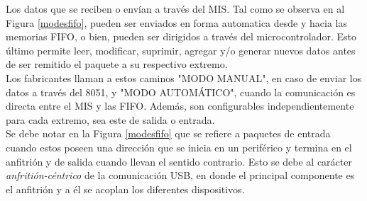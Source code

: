 		Los datos que se reciben o envían a través del MIS. Tal como se observa en al Figura \ref{modesfifo}, pueden ser enviados en forma automatica desde y hacia las memorias FIFO, o bien, pueden ser dirigidos a través del microcontrolador. Esto último permite leer, modificar, suprimir, agregar y/o generar nuevos datos antes de ser remitido el paquete a su respectivo extremo.\\
	
		Los fabricantes llaman a estos caminos "MODO MANUAL", en caso de enviar los datos a través del 8051, y "MODO AUTOMÁTICO", cuando la comunicación es directa entre el MIS y las FIFO. Además, son configurables independientemente para cada extremo, sea este de salida o entrada.\\
	
		Se debe notar en la Figura \ref{modesfifo} que se refiere a paquetes de entrada cuando estos poseen una dirección que se inicia en un periférico y termina en el anfitrión y de salida cuando llevan el sentido contrario. Esto se debe al carácter {\it anfritión-céntrico} de la comunicación USB, en donde el principal componente es el anfitrión y a él se acoplan los diferentes dispositivos.\\


